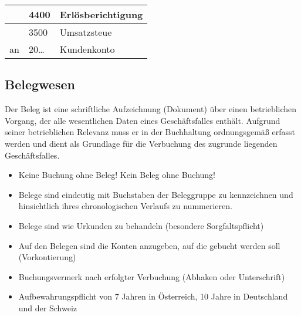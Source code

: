 \documentclass[letterpaper,10pt,english]{sphinxmanual}
\begin{document}
\begin{DUlineblock}{0em}
\item[] 
\end{DUlineblock}


\begin{savenotes}\sphinxattablestart
\centering
\begin{tabulary}{\linewidth}[t]{|T|T|T|}
\hline
&
4400
&
Erlösberichtigung
\\
\hline&
3500
&
Umsatzsteue
\\
\hline
an
&
20…
&
Kundenkonto
\\
\hline
\end{tabulary}
\par
\sphinxattableend\end{savenotes}


\subsection{Belegwesen}
\label{\detokenize{pool1:belegwesen}}
\begin{DUlineblock}{0em}
\item[] 
\item[] Der Beleg ist eine schriftliche Aufzeichnung (Dokument) über einen betrieblichen Vorgang, der alle wesentlichen Daten eines Geschäftsfalles enthält. Aufgrund seiner betrieblichen Relevanz muss er in der Buchhaltung ordnungsgemäß erfasst werden und dient als Grundlage für die Verbuchung des zugrunde liegenden Geschäftsfalles.
\item[] 
\item[] 
\end{DUlineblock}
\begin{itemize}
\item {} 
Keine Buchung ohne Beleg! Kein Beleg ohne Buchung!

\item {} 
Belege sind eindeutig mit Buchstaben der Beleggruppe zu kennzeichnen und hinsichtlich ihres chronologischen Verlaufs zu nummerieren.

\item {} 
Belege sind wie Urkunden zu behandeln (besondere Sorgfaltspflicht)

\item {} 
Auf den Belegen sind die Konten anzugeben, auf die gebucht werden soll (Vorkontierung)

\item {} 
Buchungsvermerk nach erfolgter Verbuchung (Abhaken oder Unterschrift)

\item {} 
Aufbewahrungspflicht von 7 Jahren in Österreich, 10 Jahre in Deutschland und der Schweiz

\end{itemize}
\end{document}
